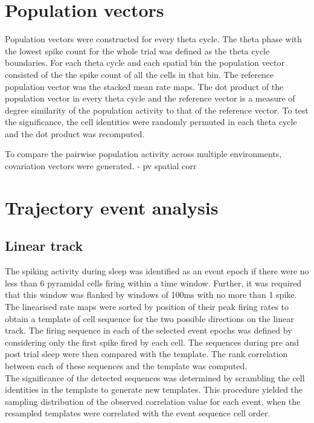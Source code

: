 \section{Population vectors}
Population vectors were constructed for every theta cycle. The theta phase with the lowest spike count for the whole trial was defined as the theta cycle boundaries. For each theta cycle and each spatial bin the population vector consisted of the the spike count of all the cells in that bin. The reference population vector was the stacked mean rate maps. The dot product of the population vector in every theta cycle and the reference vector is a measure of degree similarity of the population activity to that of the reference vector. To test the significance, the cell identities were randomly permuted in each theta cycle and the dot product was recomputed. 

To compare the pairwise population activity across multiple environments, covariation vectors were generated. 
\cite{Gothard1996} - pv spatial corr 

\section{Trajectory event analysis}
\subsection{Linear track}
The spiking activity during sleep was identified as an event epoch if there were no less than 6 pyramidal cells firing within a time window. Further, it was required that this window was flanked by windows of 100ms with no more than 1 spike. The linearised rate maps were sorted by position of their peak firing rates to obtain a template of cell sequence for the two possible directions on the linear track. The firing sequence in each of the selected event epochs was defined by considering only the first spike fired by each cell. The sequences during pre and post trial sleep were then compared with the template. The rank correlation between each of these sequences and the template was computed. \\ 
The significance of the detected sequences was determined by scrambling the cell identities in the template to generate new templates. This procedure yielded the sampling distribution of the observed correlation value for each event, when the resampled templates were correlated with the event sequence cell order. \\

